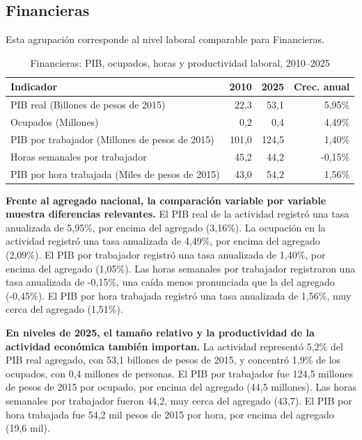 \subsection{Financieras}

Esta agrupación corresponde al nivel laboral comparable para Financieras.

\begin{table}[H]
\centering
\caption{Financieras: PIB, ocupados, horas y productividad laboral, 2010--2025}
\label{tab:agg25_k_productividad}
\small
\begin{tabular}{lrrr}
\toprule
Indicador & 2010 & 2025 & Crec. anual \\
\midrule
PIB real  (Billones de pesos de 2015) & 22,3 & 53,1 & 5,95\% \\
Ocupados (Millones) & 0,2 & 0,4 & 4,49\% \\
PIB por trabajador (Millones de pesos de 2015) & 101,0 & 124,5 & 1,40\% \\
Horas semanales por trabajador & 45,2 & 44,2 & -0,15\% \\
PIB por hora trabajada (Miles de pesos de 2015) & 43,0 & 54,2 & 1,56\% \\
\bottomrule
\end{tabular}
\end{table}

\textbf{Frente al agregado nacional, la comparación variable por variable muestra diferencias relevantes.} El PIB real de la actividad registró una tasa anualizada de 5,95\%, por encima del agregado (3,16\%). La ocupación en la actividad registró una tasa anualizada de 4,49\%, por encima del agregado (2,09\%). El PIB por trabajador registró una tasa anualizada de 1,40\%, por encima del agregado (1,05\%). Las horas semanales por trabajador registraron una tasa anualizada de -0,15\%, una caída menos pronunciada que la del agregado (-0,45\%). El PIB por hora trabajada registró una tasa anualizada de 1,56\%, muy cerca del agregado (1,51\%).

\textbf{En niveles de 2025, el tamaño relativo y la productividad de la actividad económica también importan.} La actividad representó 5,2\% del PIB real agregado, con 53,1 billones de pesos de 2015, y concentró 1,9\% de los ocupados, con 0,4 millones de personas. El PIB por trabajador fue 124,5 millones de pesos de 2015 por ocupado, por encima del agregado (44,5 millones). Las horas semanales por trabajador fueron 44,2, muy cerca del agregado (43,7). El PIB por hora trabajada fue 54,2 mil pesos de 2015 por hora, por encima del agregado (19,6 mil).

